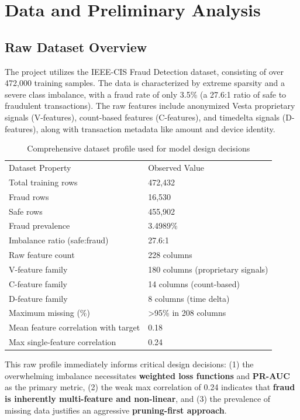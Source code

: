 \documentclass[10pt,journal,compsoc,twocolumn]{IEEEtran}
\newcommand{\tableheader}{\rowcolor{tablehead}}
\begin{document}
\section{Data and Preliminary Analysis}

\subsection{Raw Dataset Overview}
The project utilizes the IEEE-CIS Fraud Detection dataset, consisting of over 472,000 training samples. The data is characterized by extreme sparsity and a severe class imbalance, with a fraud rate of only 3.5\% (a 27.6:1 ratio of safe to fraudulent transactions). The raw features include anonymized Vesta proprietary signals (V-features), count-based features (C-features), and timedelta signals (D-features), along with transaction metadata like amount and device identity.

\begin{table}[H]
\centering
\caption{Comprehensive dataset profile used for model design decisions}
\begin{tabular}{p{}p{}}
\tableheader
Dataset Property & Observed Value \\
Total training rows & 472,432 \\
Fraud rows & 16,530 \\
Safe rows & 455,902 \\
Fraud prevalence & 3.4989\% \\
Imbalance ratio (safe:fraud) & 27.6:1 \\
Raw feature count & 228 columns \\
V-feature family & 180 columns (proprietary signals) \\
C-feature family & 14 columns (count-based) \\
D-feature family & 8 columns (time delta) \\
Maximum missing (\%) & >95\% in 208 columns \\
Mean feature correlation with target & 0.18 \\
Max single-feature correlation & 0.24 \\
\end{tabular}
\end{table}

This raw profile immediately informs critical design decisions: (1) the overwhelming imbalance necessitates \textbf{weighted loss functions} and \textbf{PR-AUC} as the primary metric, (2) the weak max correlation of 0.24 indicates that \textbf{fraud is inherently multi-feature and non-linear}, and (3) the prevalence of missing data justifies an aggressive \textbf{pruning-first approach}.
\end{document}
